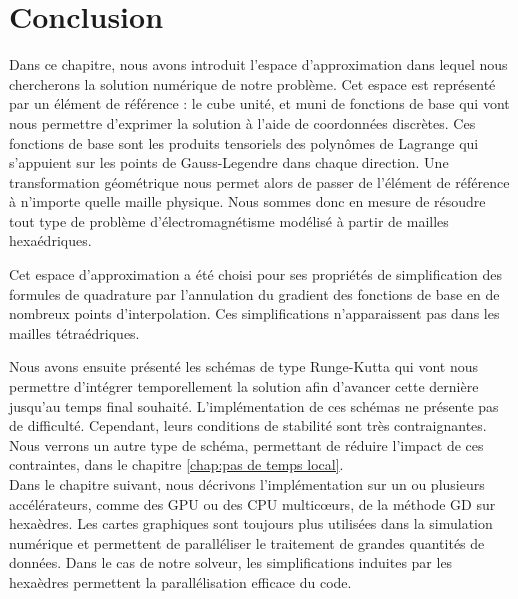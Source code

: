 \section*{Conclusion}



Dans ce chapitre, nous avons introduit l'espace d’approximation
dans lequel nous chercherons la solution numérique de notre problème.
Cet espace est représenté par un élément de référence : le cube unité, 
et muni de fonctions de base qui vont nous permettre d'exprimer
la solution à l'aide de coordonnées discrètes.
Ces fonctions de base sont les produits tensoriels des polynômes de Lagrange
qui s'appuient sur les points de Gauss-Legendre dans chaque direction.
Une transformation géométrique nous permet alors de passer
de l'élément de référence à n'importe quelle maille physique.
Nous sommes donc en mesure de résoudre tout type de problème
d'électromagnétisme modélisé à partir de mailles hexaédriques.

Cet espace d'approximation a été choisi pour ses propriétés de
simplification des formules de quadrature par l'annulation
du gradient des fonctions de base en de nombreux points d'interpolation.
Ces simplifications n'apparaissent pas dans les mailles tétraédriques.

Nous avons ensuite présenté les schémas de type Runge-Kutta
qui vont nous permettre d'intégrer temporellement la solution
afin d'avancer cette dernière jusqu'au temps final souhaité.
L'implémentation de ces schémas ne présente pas de difficulté.
Cependant, leurs conditions de stabilité sont très contraignantes.
Nous verrons un autre type de schéma, permettant de réduire
l'impact de ces contraintes, dans le chapitre \ref{chap:pas de temps local}.
\\


Dans le chapitre suivant,
nous décrivons l’implémentation sur un ou plusieurs
accélérateurs, comme des GPU ou des CPU multicœurs, de la méthode GD sur hexaèdres.
Les cartes graphiques sont toujours plus utilisées dans la simulation numérique
et permettent de paralléliser le traitement de grandes quantités de données.
Dans le cas de notre solveur, les simplifications induites par les hexaèdres
permettent la parallélisation efficace du code.

